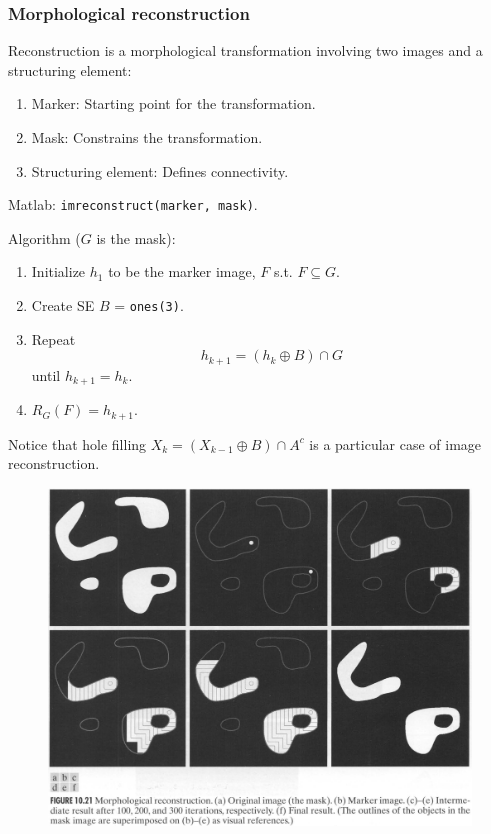 \begin{frame}
\frametitle{Morphological reconstruction}
Reconstruction is a morphological transformation involving two images and a structuring element:
\begin{enumerate}
\item Marker: Starting point for the transformation.
\item Mask: Constrains the transformation.
\item Structuring element: Defines connectivity.
\end{enumerate}
Matlab: \texttt{imreconstruct(marker, mask)}.
\end{frame}

\begin{frame}
Algorithm ($G$ is the mask):
\begin{enumerate}
\item Initialize $h_{1}$ to be the marker image, $F$ s.t. $F \subseteq G$.
\item Create SE $B$ = \texttt{ones(3)}.
\item Repeat
\[
h_{k+1} = \left ( h_{k} \oplus B \right ) \cap G
\]
until $h_{k+1} = h_{k}$.
\item $R_{G}(F) = h_{k+1}$.
\end{enumerate}
Notice that hole filling $X_{k} = \left ( X_{k-1} \oplus B \right ) \cap A^{c}$ is a particular case of image reconstruction.
\end{frame}

\begin{frame}
\begin{figure}[!h]
\includegraphics[width=.8\textwidth]{fig-10-21.png}
\end{figure}
\end{frame}

